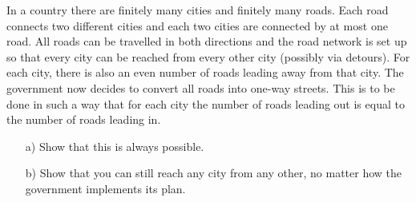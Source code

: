 In a country there are finitely many cities and finitely many roads.
Each road connects two different cities and each two cities are connected by at most one road.
All roads can be travelled in both directions and the road network is set up so that every
city can be reached from every other city (possibly via detours).
For each city, there is also an even number of roads leading away from that city.
The government now decides to convert all roads into one-way streets.
This is to be done in such a way that for each city the number of roads leading out is
equal to the number of roads leading in.
\begin{enumerate}
    \item[a)] Show that this is always possible.
    \item[b)] Show that you can still reach any city from any other,
    no matter how the government implements its plan.
\end{enumerate}
